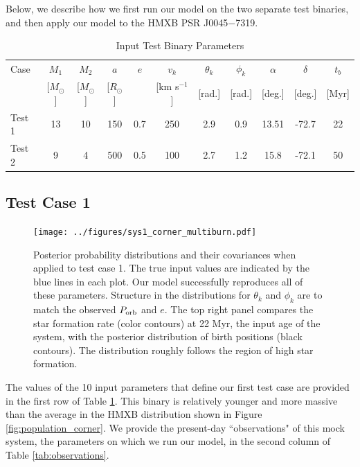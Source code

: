 \documentclass[12pt, preprint]{aastex}
\begin{document}
Below, we describe how we first run our model on the two separate test binaries, and then apply our model to the HMXB PSR J0045$-$7319.


\begin{table}
\label{tab:mock_data}
\begin{center}
\caption{Input Test Binary Parameters}
\begin{tabular}{lcccccccccc} 
\toprule
Case & $M_1$ & $M_2$ & $a$ & $e$ & $v_k$ & $\theta_k$ & $\phi_k$ & $\alpha$ & $\delta$ & $t_b$ \\
 & [$M_{\odot}$] & [$M_{\odot}$] & [$R_{\odot}$] & & [km s$^{-1}$] & [rad.] & [rad.] & [deg.] & [deg.] & [Myr] \\ 
\midrule
Test 1 & 13 & 10 & 150 & 0.7 & 250 & 2.9 & 0.9 & 13.51 & -72.7 & 22 \\
Test 2 & 9 & 4 & 500 & 0.5 & 100 & 2.7 & 1.2 & 15.8 & -72.1 & 50 \\
\bottomrule
\end{tabular}
\end{center}
\end{table}


\subsection{Test Case 1}


\begin{figure}[h!]
\begin{center}
\texttt{[image: ../figures/sys1\_corner\_multiburn.pdf]}
\caption{Posterior probability distributions and their covariances when applied to test case 1. The true input values are indicated by the blue lines in each plot. Our model successfully reproduces all of these parameters. Structure in the distributions for $\theta_k$ and $\phi_k$ are to match the observed $P_{\rm orb}$ and $e$. The top right panel compares the star formation rate (color contours) at 22 Myr, the input age of the system, with the posterior distribution of birth positions (black contours). The distribution roughly follows the region of high star formation. }
\label{fig:test1_corner}
\end{center}
\end{figure}

The values of the 10 input parameters that define our first test case are provided in the first row of Table \ref{tab:mock_data}. This binary is relatively younger and more massive than the average in the HMXB distribution shown in Figure \ref{fig:population_corner}. We provide the present-day ``observations" of this mock system, the parameters on which we run our model, in the second column of Table \ref{tab:observations}.
\end{document}
